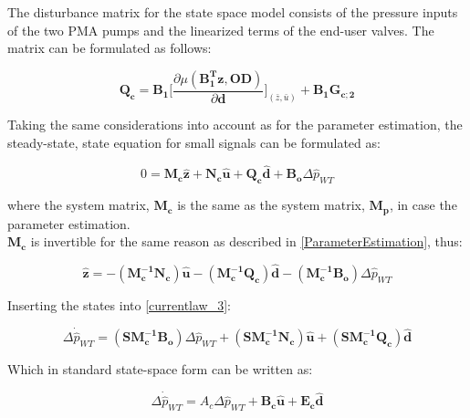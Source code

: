 The disturbance matrix for the state space model consists of the pressure inputs of the two PMA pumps and the linearized terms of the end-user valves. The matrix can be formulated as follows: 

\begin{equation}
  \pmb{Q_c} = \pmb{B_1} \bigg[ \frac{\partial{\mu(\pmb{{B_1^{T}}}\pmb{z}, \pmb{OD})}}{{\partial{\pmb{d}}}}  \bigg]_{(\bar{z}, \bar{u})} + \pmb{B_1}\pmb{G_{c;2}}  
\label{disturbance_matrix}
\end{equation}

Taking the same considerations into account as for the parameter estimation, the steady-state, state equation for small signals can be formulated as: 

 \begin{equation}
 0 = \pmb{M_c} \pmb{\hat{z}} + \pmb{N_c} \pmb{\hat{u}} + \pmb{Q_c} \pmb{\hat{d}} + \pmb{B_o} \Delta \hat{p}_{WT}    
 \label{statespace_control_sys}
\end{equation}

where the system matrix, $\pmb{M_c}$ is the same as the system matrix, $\pmb{M_p}$, in case the parameter estimation. 
\\
$\pmb{M_c}$ is invertible for the same reason as described in \eqref{ParameterEstimation}, thus:

 \begin{equation}
 \pmb{\hat{z}} =  - (\pmb{M_c^{-1}}\pmb{N_c}) \pmb{\hat{u}} - (\pmb{M_c^{-1}}\pmb{Q_c}) \pmb{\hat{d}} - (\pmb{M_c^{-1}}\pmb{B_o}) \Delta \hat{p}_{WT}    
 \label{statespace_control_sys_state}
\end{equation}

Inserting the states into \eqref{currentlaw_3}:

 \begin{equation}
\Delta \dot{\hat{p}}_{WT} = (\pmb{S}\pmb{M_c^{-1}}\pmb{B_o}) \Delta \hat{p}_{WT}  + (\pmb{S}\pmb{M_c^{-1}}\pmb{N_c}) \pmb{\hat{u}} + (\pmb{S}\pmb{M_c^{-1}}\pmb{Q_c}) \pmb{\hat{d}} 
 \label{statespace_control_sys_state_1}
\end{equation}

Which in standard state-space form can be written as: 

 \begin{equation}
\Delta \dot{\hat{p}}_{WT} = A_c \Delta \hat{p}_{WT}  + \pmb{B_c} \pmb{\hat{u}} + \pmb{E_c} \pmb{\hat{d}} 
 \label{statespace_control_sys_state_2}
\end{equation}

